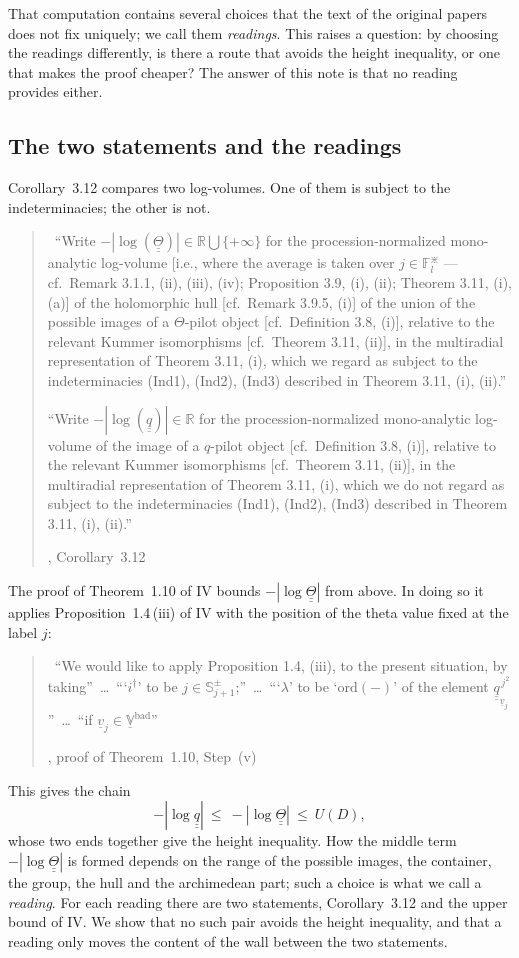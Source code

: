 \documentclass[11pt,a4paper]{article}
\newcommand{\qq}{\underline{\underline{q}}}
\newcommand{\TT}{\underline{\underline{\Theta}}}
\newcommand{\lab}[2]{{\upshape\fcolorbox{#1}{#1!8}{\scriptsize\sffamily\bfseries\textcolor{#1}{#2}}}}
\newcommand{\tagS}{\lab{blue}{S}}
\newcommand{\q}[1]{``#1''}
\newcommand{\srcquote}[2]{\begin{quote}\small #1\par\nopagebreak\hfill{\footnotesize #2}\end{quote}}
\theoremstyle{plain}
\theoremstyle{definition}
\theoremstyle{remark}
\begin{document}
That computation contains several choices that the text of the original papers does not fix uniquely; we call them
\emph{readings}. This raises a question: by choosing the readings differently, is there a route that avoids the height
inequality, or one that makes the proof cheaper? The answer of this note is that no reading provides either.

\subsection{The two statements and the readings}\label{ss:two}
Corollary~3.12 compares two log-volumes. One of them is subject to the indeterminacies; the other is not.

\srcquote{\tagS\ \q{Write $-|\log(\TT)|\in\mathbb{R}\bigcup\{+\infty\}$ for the procession-normalized mono-analytic
log-volume [i.e., where the average is taken over $j\in\mathbb{F}_l^{\divideontimes}$ --- cf.\ Remark 3.1.1, (ii),
(iii), (iv); Proposition 3.9, (i), (ii); Theorem 3.11, (i), (a)] of the holomorphic hull [cf.\ Remark 3.9.5, (i)] of
the union of the possible images of a $\Theta$-pilot object [cf.\ Definition 3.8, (i)], relative to the relevant
Kummer isomorphisms [cf.\ Theorem 3.11, (ii)], in the multiradial representation of Theorem 3.11, (i), which we regard
as subject to the indeterminacies (Ind1), (Ind2), (Ind3) described in Theorem 3.11, (i), (ii).}\par
\q{Write $-|\log(\qq)|\in\mathbb{R}$ for the procession-normalized mono-analytic log-volume of the image of a
$q$-pilot object [cf.\ Definition 3.8, (i)], relative to the relevant Kummer isomorphisms [cf.\ Theorem 3.11, (ii)],
in the multiradial representation of Theorem 3.11, (i), which we do not regard as subject to the indeterminacies
(Ind1), (Ind2), (Ind3) described in Theorem 3.11, (i), (ii).}}{\cite{IUT3}, Corollary~3.12}

The proof of Theorem~1.10 of IV bounds $-|\log\TT|$ from above. In doing so it applies Proposition~1.4\,(iii) of IV
with the position of the theta value fixed at the label $j$:

\srcquote{\tagS\ \q{We would like to apply Proposition 1.4, (iii), to the present situation, by taking}\ \dots\
\q{`$i^\dagger$' to be $j\in\mathbb{S}^{\pm}_{j+1}$;}\ \dots\ \q{`$\lambda$' to be `$\mathrm{ord}(-)$' of the
element $\qq^{\,j^2}_{\underline{v}_j}$}\ \dots\ \q{if $\underline{v}_j\in\underline{\mathbb{V}}^{\mathrm{bad}}$}}{\cite{IUT4},
proof of Theorem~1.10, Step~(v)}

This gives the chain
\[-|\log\qq|\ \le\ -|\log\TT|\ \le\ U(D),\]
whose two ends together give the height inequality. How the middle term $-|\log\TT|$ is formed depends on the range of
the possible images, the container, the group, the hull and the archimedean part; such a choice is what we call a
\emph{reading}. For each reading there are two statements, Corollary~3.12 and the upper bound of IV. We show that no
such pair avoids the height inequality, and that a reading only moves the content of the wall between the two
statements.
\end{document}
